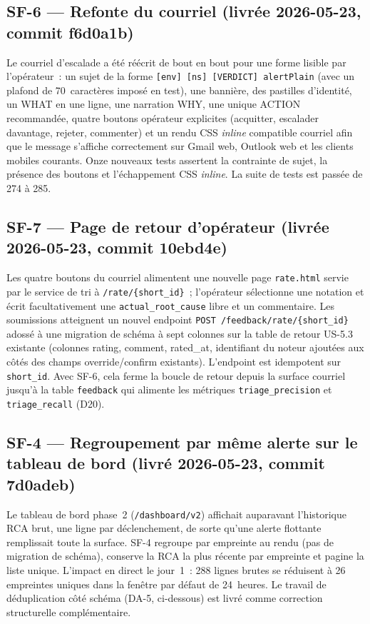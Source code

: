 \documentclass[11pt,a4paper,oneside]{report}
\begin{document}
\subsection{SF-6 --- Refonte du courriel (livrée 2026-05-23, commit f6d0a1b)}

Le courriel d'escalade a été réécrit de bout en bout pour une
forme lisible par l'opérateur~: un sujet de la forme
\texttt{[env] [ns] [VERDICT] alertPlain} (avec un plafond de
70~caractères imposé en test), une bannière, des pastilles
d'identité, un WHAT en une ligne, une narration WHY, une unique
ACTION recommandée, quatre boutons opérateur explicites
(acquitter, escalader davantage, rejeter, commenter) et un rendu
CSS \emph{inline} compatible courriel afin que le message s'affiche
correctement sur Gmail web, Outlook web et les clients mobiles
courants. Onze nouveaux tests assertent la contrainte de sujet, la
présence des boutons et l'échappement CSS \emph{inline}. La suite
de tests est passée de 274 à 285.

\subsection{SF-7 --- Page de retour d'opérateur (livrée 2026-05-23, commit 10ebd4e)}

Les quatre boutons du courriel alimentent une nouvelle page
\texttt{rate.html} servie par le service de tri à
\texttt{/rate/\{short\_id\}}~; l'opérateur sélectionne une notation
et écrit facultativement une \texttt{actual\_root\_cause} libre et
un commentaire. Les soumissions atteignent un nouvel endpoint
\texttt{POST /feedback/rate/\{short\_id\}} adossé à une migration
de schéma à sept colonnes sur la table de retour US-5.3 existante
(colonnes rating, comment, rated\_at, identifiant du noteur
ajoutées aux côtés des champs override/confirm existants).
L'endpoint est idempotent sur \texttt{short\_id}. Avec SF-6, cela
ferme la boucle de retour depuis la surface courriel jusqu'à la
table \texttt{feedback} qui alimente les métriques
\texttt{triage\_precision} et \texttt{triage\_recall} (D20).

\subsection{SF-4 --- Regroupement par même alerte sur le tableau de bord (livré 2026-05-23, commit 7d0adeb)}

Le tableau de bord phase~2 (\texttt{/dashboard/v2}) affichait
auparavant l'historique RCA brut, une ligne par déclenchement, de
sorte qu'une alerte flottante remplissait toute la surface. SF-4
regroupe par empreinte au rendu (pas de migration de schéma),
conserve la RCA la plus récente par empreinte et pagine la liste
unique. L'impact en direct le jour~1~: 288 lignes brutes se
réduisent à 26 empreintes uniques dans la fenêtre par défaut de
24~heures. Le travail de déduplication côté schéma (DA-5,
ci-dessous) est livré comme correction structurelle
complémentaire.
\end{document}
